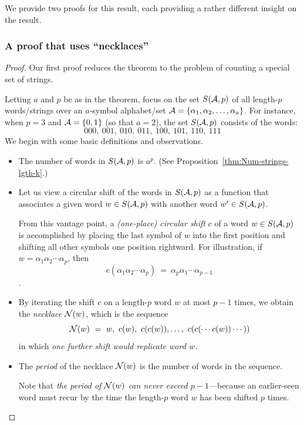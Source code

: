 \smallskip

\noindent
We provide two proofs for this result, each providing a rather different insight on the result.

\subsubsection{A proof that uses ``necklaces''}
\label{sec:FTL-necklaces}

\begin{proof}
Our first proof reduces the theorem to the problem of counting a special set of strings.

Letting $a$ and $p$ be as in the theorem, focus on the set $S(\mbox{$\cal A$},p)$ of all length-$p$ words/strings over an $a$-symbol alphabet/set $\mbox{$\cal A$} = \{ \alpha_1, \alpha_2, \ldots, \alpha_a \}$.  For instance, when $p=3$ and $\mbox{$\cal A$} = \{0,1\}$ (so that $a=2$), the set $S(\mbox{$\cal A$},p)$ consists of the words:
\[ 000, \ 001, \ 010, \ 011, \ 100, \ 101, \ 110, \ 111 \]
We begin with some basic definitions and observations.
\begin{itemize}
\item
The number of words in $S(\mbox{$\cal A$},p)$ is $a^p$.  (See Proposition~\ref{thm:Num-strings-lgth-k}.)

\item
Let us view a circular shift of the words in $S(\mbox{$\cal A$},p)$ as a function that associates a given word $w \in S(\mbox{$\cal A$},p)$ with another word $w' \in S(\mbox{$\cal A$},p)$.

\smallskip

From this vantage point, a {\it (one-place) circular shift} $c$ of a word $w \in S(\mbox{$\cal A$},p)$ is accomplished by placing the last symbol of $w$ into the first position and shifting all other symbols one position rightward.  For illustration, if $w = \alpha_1 \alpha_2 \cdots \alpha_p$, then
\[ c(\alpha_1 \alpha_2 \cdots \alpha_p) \ = \ \alpha_p \alpha_1 \cdots \alpha_{p-1} \].

\item
By iterating the shift $c$ on a length-$p$ word $w$ at most $p-1$
times, we obtain the {\it necklace} $\mbox{$\cal N$}(w)$, which is the sequence
\[ \n(w) \ = \ w, \ c(w), \ c(c(w)), \ldots, \ c(c(\cdots c(w)) \cdots )) \]
in which {\em one further shift would replicate word $w$.}

\item
The {\it period} of the necklace $\mbox{$\cal N$}(w)$ is the number of words in the sequence.

\smallskip

Note that {\em the period of $\mbox{$\cal N$}(w)$ can never exceed $p-1$}---because an earlier-seen word must recur by the time the length-$p$ word $w$ has been shifted $p$ times.
\end{itemize}


\end{proof}
